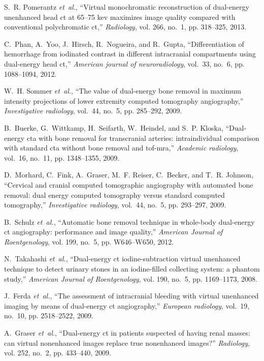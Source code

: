\documentclass[journal,twoside,web]{ieeecolor}
\begin{document}
\begin{thebibliography}{10}
S.~R. Pomerantz \emph{et~al.}, ``Virtual monochromatic reconstruction of
  dual-energy unenhanced head ct at 65--75 kev maximizes image quality compared
  with conventional polychromatic ct,'' \emph{Radiology}, vol. 266, no.~1, pp.
  318--325, 2013.

C.~Phan, A.~Yoo, J.~Hirsch, R.~Nogueira, and R.~Gupta, ``Differentiation of
  hemorrhage from iodinated contrast in different intracranial compartments
  using dual-energy head ct,'' \emph{American journal of neuroradiology},
  vol.~33, no.~6, pp. 1088--1094, 2012.

W.~H. Sommer \emph{et~al.}, ``The value of dual-energy bone removal in maximum
  intensity projections of lower extremity computed tomography angiography,''
  \emph{Investigative radiology}, vol.~44, no.~5, pp. 285--292, 2009.

B.~Buerke, G.~Wittkamp, H.~Seifarth, W.~Heindel, and S.~P. Kloska,
  ``Dual-energy cta with bone removal for transcranial arteries:
  intraindividual comparison with standard cta without bone removal and
  tof-mra,'' \emph{Academic radiology}, vol.~16, no.~11, pp. 1348--1355, 2009.

D.~Morhard, C.~Fink, A.~Graser, M.~F. Reiser, C.~Becker, and T.~R. Johnson,
  ``Cervical and cranial computed tomographic angiography with automated bone
  removal: dual energy computed tomography versus standard computed
  tomography,'' \emph{Investigative radiology}, vol.~44, no.~5, pp. 293--297,
  2009.

B.~Schulz \emph{et~al.}, ``Automatic bone removal technique in whole-body
  dual-energy ct angiography: performance and image quality,'' \emph{American
  Journal of Roentgenology}, vol. 199, no.~5, pp. W646--W650, 2012.

N.~Takahashi \emph{et~al.}, ``Dual-energy ct iodine-subtraction virtual
  unenhanced technique to detect urinary stones in an iodine-filled collecting
  system: a phantom study,'' \emph{American Journal of Roentgenology}, vol.
  190, no.~5, pp. 1169--1173, 2008.

J.~Ferda \emph{et~al.}, ``The assessment of intracranial bleeding with virtual
  unenhanced imaging by means of dual-energy ct angiography,'' \emph{European
  radiology}, vol.~19, no.~10, pp. 2518--2522, 2009.

A.~Graser \emph{et~al.}, ``Dual-energy ct in patients suspected of having renal
  masses: can virtual nonenhanced images replace true nonenhanced images?''
  \emph{Radiology}, vol. 252, no.~2, pp. 433--440, 2009.


\end{thebibliography}
\end{document}
